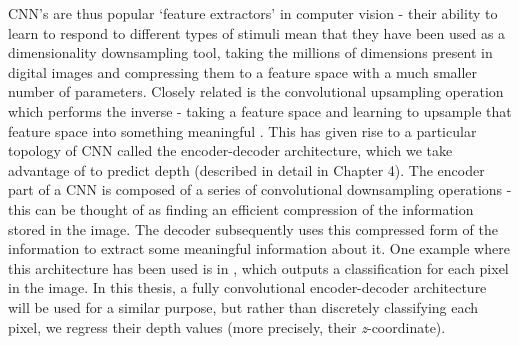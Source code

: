 CNN's are thus popular `feature extractors' in computer vision - their ability to learn to respond to different types of stimuli mean that they have been used as a dimensionality downsampling tool, taking the millions of dimensions present in digital images  and compressing them to a feature space with a much smaller number of parameters. Closely related is the convolutional upsampling operation which performs the inverse - taking a feature space and learning to upsample that feature space into something meaningful \cite{long2014fcn}. This has given rise to a particular topology of CNN called the encoder-decoder architecture, which we take advantage of to predict depth (described in detail in Chapter 4). The encoder part of a CNN is composed of a series of convolutional downsampling operations - this can be thought of as finding an efficient compression of the information stored in the image. The decoder subsequently uses this compressed form of the information to extract some meaningful information about it. One example where this architecture has been used is in \cite{long2014fcn}, which outputs a classification for each pixel in the image. In this thesis, a fully convolutional encoder-decoder architecture will be used for a similar purpose, but rather than discretely classifying each pixel, we regress their depth values (more precisely, their \textit{z}-coordinate). 
